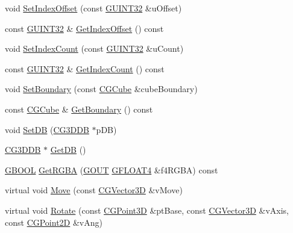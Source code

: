 \begin{DoxyCompactItemize}
\item 
void \hyperlink{class_c_g_object_base_a375a6f32ff00ed44fba0b4bb83d7f5e1}{Set\+Index\+Offset} (const \hyperlink{_g_types_8h_a2e1a1c77d1349057202e2f34e071019c}{G\+U\+I\+N\+T32} \&u\+Offset)
\item 
const \hyperlink{_g_types_8h_a2e1a1c77d1349057202e2f34e071019c}{G\+U\+I\+N\+T32} \& \hyperlink{class_c_g_object_base_abfb4c016812c703e751401a3b82dd688}{Get\+Index\+Offset} () const 
\item 
void \hyperlink{class_c_g_object_base_a9155e75c5d6481416b59454600b26b4e}{Set\+Index\+Count} (const \hyperlink{_g_types_8h_a2e1a1c77d1349057202e2f34e071019c}{G\+U\+I\+N\+T32} \&u\+Count)
\item 
const \hyperlink{_g_types_8h_a2e1a1c77d1349057202e2f34e071019c}{G\+U\+I\+N\+T32} \& \hyperlink{class_c_g_object_base_a69033defb24a80e58925248b8d61547b}{Get\+Index\+Count} () const 
\item 
void \hyperlink{class_c_g_object_base_a368602ef0ea25e8204e7a6adc675b6e8}{Set\+Boundary} (const \hyperlink{class_c_g_cube}{C\+G\+Cube} \&cube\+Boundary)
\item 
const \hyperlink{class_c_g_cube}{C\+G\+Cube} \& \hyperlink{class_c_g_object_base_aa94c605cba92c2195fba988dbbcd9227}{Get\+Boundary} () const 
\item 
void \hyperlink{class_c_g_object_base_ad0e3d78b4c9320f6475eb13c408f731c}{Set\+D\+B} (\hyperlink{class_c_g3_d_d_b}{C\+G3\+D\+D\+B} $\ast$p\+D\+B)
\item 
\hyperlink{class_c_g3_d_d_b}{C\+G3\+D\+D\+B} $\ast$ \hyperlink{class_c_g_object_base_ac469d2dbdc2c94ce3d64a3356caecb6e}{Get\+D\+B} ()
\item 
\hyperlink{_g_types_8h_a2901915743626352a6820c5405f556dc}{G\+B\+O\+O\+L} \hyperlink{class_c_g_object_base_a0820d6e1e4df3bdea32ed8b89e3ded7a}{Get\+R\+G\+B\+A} (\hyperlink{_g_types_8h_a0858ec221262e635612871d70ca233ad}{G\+O\+U\+T} \hyperlink{_g_types_8h_a647c8d47efa6fd6ce1f3aff7f33baa87}{G\+F\+L\+O\+A\+T4} \&f4\+R\+G\+B\+A) const 
\item 
virtual void \hyperlink{class_c_g_object_base_a6a1ea0c753ab6d2c98ee417d9d2b04e2}{Move} (const \hyperlink{_g_point3_d_8h_aa7e73d39f4c991acb5a13c84b498366d}{C\+G\+Vector3\+D} \&v\+Move)
\item 
virtual void \hyperlink{class_c_g_object_base_af99d2f7fe3f25ca09d6090c8779a6971}{Rotate} (const \hyperlink{class_c_g_point3_d}{C\+G\+Point3\+D} \&pt\+Base, const \hyperlink{_g_point3_d_8h_aa7e73d39f4c991acb5a13c84b498366d}{C\+G\+Vector3\+D} \&v\+Axis, const \hyperlink{class_c_g_point2_d}{C\+G\+Point2\+D} \&v\+Ang)

\end{DoxyCompactItemize}
